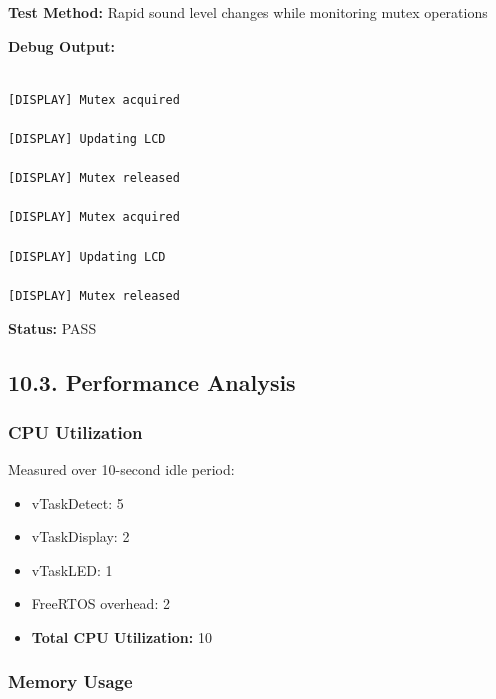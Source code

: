 \documentclass[12pt]{article}
\begin{document}
\textbf{Test Method:} Rapid sound level changes while monitoring mutex operations



\textbf{Debug Output:}

\begin{verbatim}

[DISPLAY] Mutex acquired

[DISPLAY] Updating LCD

[DISPLAY] Mutex released

[DISPLAY] Mutex acquired

[DISPLAY] Updating LCD

[DISPLAY] Mutex released

\end{verbatim}



\textbf{Status:} PASS

\subsection*{10.3. Performance Analysis}

\subsubsection*{CPU Utilization}

Measured over 10-second idle period:

\begin{itemize}
    \item vTaskDetect: 5%
    \item vTaskDisplay: 2%
    \item vTaskLED: 1%
    \item FreeRTOS overhead: 2%
    \item \textbf{Total CPU Utilization:} 10%
\end{itemize}

\subsubsection*{Memory Usage}
\end{document}
